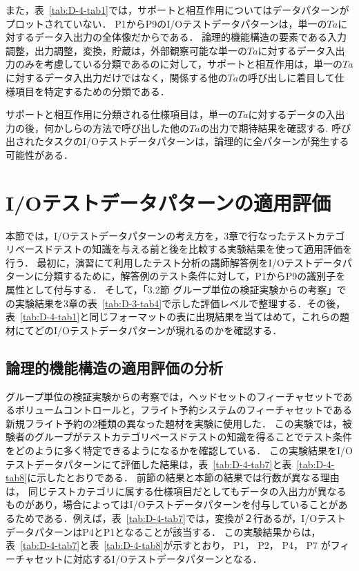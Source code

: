 また，表~\ref{tab:D-4-tab1}では，サポートと相互作用についてはデータパターンがプロットされていない．
P1からP9のI/Oテストデータパターンは，単一の$Ta$に対するデータ入出力の全体像だからである．
論理的機能構造の要素である入力調整，出力調整，変換，貯蔵は，外部観察可能な単一の$Ta$に対するデータ入出力のみを考慮している分類であるのに対して，サポートと相互作用は，単一の$Ta$に対するデータ入出力だけではなく，関係する他の$Ta$の呼び出しに着目して仕様項目を特定するための分類である．

サポートと相互作用に分類される仕様項目は，単一の$Ta$に対するデータの入出力の後，何かしらの方法で呼び出した他の$Ta$の出力で期待結果を確認する.
呼び出されたタスクのI/Oテストデータパターンは，論理的に全パターンが発生する可能性がある．


\newpage
\section{I/Oテストデータパターンの適用評価}
本節では，I/Oテストデータパターンの考え方を，3章で行なったテストカテゴリベースドテストの知識を与える前と後を比較する実験結果を使って適用評価を行う．
最初に，演習にて利用したテスト分析の講師解答例をI/Oテストデータパターンに分類するために，解答例のテスト条件に対して，P1からP9の識別子を属性として付与する．
そして，「3.2節 グループ単位の検証実験からの考察」での実験結果を3章の表~\ref{tab:D-3-tab4}で示した評価レベルで整理する．その後，表~\ref{tab:D-4-tab1}と同じフォーマットの表に出現結果を当てはめて，これらの題材にてどのI/Oテストデータパターンが現れるのかを確認する．

\subsection{論理的機能構造の適用評価の分析}
グループ単位の検証実験からの考察では，ヘッドセットのフィーチャセットであるボリュームコントロールと，フライト予約システムのフィーチャセットである新規フライト予約の2種類の異なった題材を実験に使用した．
この実験では，被験者のグループがテストカテゴリベースドテストの知識を得ることでテスト条件をどのように多く特定できるようになるかを確認している．
この実験結果をI/Oテストデータパターンにて評価した結果は，表~\ref{tab:D-4-tab7}と表~\ref{tab:D-4-tab8}に示したとおりである．
前節の結果と本節の結果では行数が異なる理由は， 同じテストカテゴリに属する仕様項目だとしてもデータの入出力が異なるものがあり，場合によってはI/Oテストデータパターンを付与していることがあるためである．例えば，表~\ref{tab:D-4-tab7}では，変換が２行あるが，I/OテストデータパターンはP4とP1となることが該当する．
この実験結果からは，表~\ref{tab:D-4-tab7}と表~\ref{tab:D-4-tab8}が示すとおり， P1， P2， P4， P7 がフィーチャセットに対応するI/Oテストデータパターンとなる．

